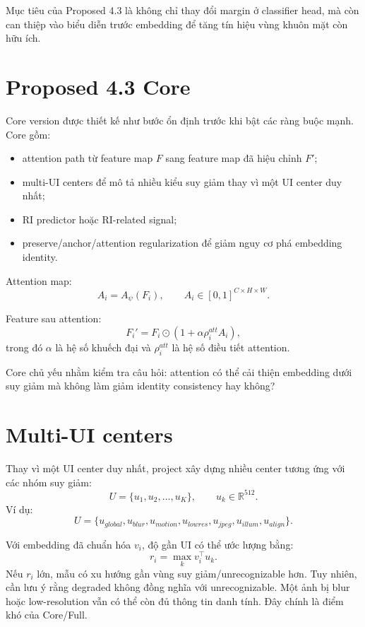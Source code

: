 \documentclass[13pt,a4paper]{extreport}
\newcommand{\R}{\mathbb{R}}
\begin{document}
Mục tiêu của Proposed 4.3 là không chỉ thay đổi margin ở classifier head, mà còn can thiệp vào biểu diễn trước embedding để tăng tín hiệu vùng khuôn mặt còn hữu ích.

\section{Proposed 4.3 Core}
Core version được thiết kế như bước ổn định trước khi bật các ràng buộc mạnh. Core gồm:
\begin{itemize}[leftmargin=1.2cm]
    \item attention path từ feature map $F$ sang feature map đã hiệu chỉnh $F'$;
    \item multi-UI centers để mô tả nhiều kiểu suy giảm thay vì một UI center duy nhất;
    \item RI predictor hoặc RI-related signal;
    \item preserve/anchor/attention regularization để giảm nguy cơ phá embedding identity.
\end{itemize}

Attention map:
\begin{equation}
    A_i=A_\psi(F_i), \qquad A_i\in [0,1]^{C\times H\times W}.
\end{equation}

Feature sau attention:
\begin{equation}
    F_i' = F_i \odot \left(1+\alpha\rho_i^{att}A_i\right),
\end{equation}
trong đó $\alpha$ là hệ số khuếch đại và $\rho_i^{att}$ là hệ số điều tiết attention.

Core chủ yếu nhằm kiểm tra câu hỏi: attention có thể cải thiện embedding dưới suy giảm mà không làm giảm identity consistency hay không?

\section{Multi-UI centers}
Thay vì một UI center duy nhất, project xây dựng nhiều center tương ứng với các nhóm suy giảm:
\begin{equation}
    U=\{u_1,u_2,\ldots,u_K\}, \qquad u_k\in\R^{512}.
\end{equation}
Ví dụ:
\begin{equation}
    U=\{u_{global},u_{blur},u_{motion},u_{lowres},u_{jpeg},u_{illum},u_{align}\}.
\end{equation}

Với embedding đã chuẩn hóa $v_i$, độ gần UI có thể ước lượng bằng:
\begin{equation}
    r_i = \max_k v_i^\top u_k.
\end{equation}
Nếu $r_i$ lớn, mẫu có xu hướng gần vùng suy giảm/unrecognizable hơn. Tuy nhiên, cần lưu ý rằng degraded không đồng nghĩa với unrecognizable. Một ảnh bị blur hoặc low-resolution vẫn có thể còn đủ thông tin danh tính. Đây chính là điểm khó của Core/Full.
\end{document}
